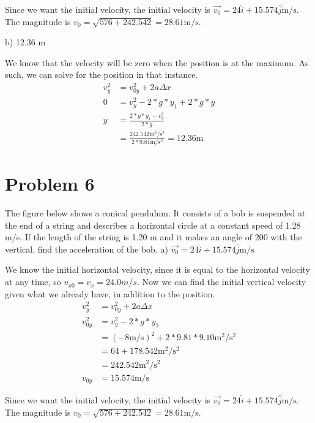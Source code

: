 \documentclass[12pt]{article}
\begin{document}
Since we want the initial velocity, the initial velocity is $ \boxed{ \vec{v_0} = 24\hat{i} + 15.574 \hat{j} \unit{\meter/\second} } $. The magnitude is $ v_0 = \sqrt{576 + 242.542} = 28.61 \unit{\meter/\second} $.

b) 12.36 m

We know that the velocity will be zero when the position is at the maximum. As such, we can solve for the position in that instance.
\begin{align}
    v_y^2 &= v_{0y}^2 + 2a\Delta x\\
    0 &= v_y^2 - 2*g*y_1 + 2*g*y\\
    y &= \frac{2*g*y_1 - v_y^2}{2*g}\\
        &= \frac{242.542 \unit{\meter^2/\second^2}}{2*9.81 \unit{\meter/\second^2}} = \boxed{ 12.36 \unit{\meter} }
\end{align}

\pagebreak
\section*{Problem 6}
The figure below shows a conical pendulum. It consists of a bob is suspended at the end of a
string and describes a horizontal circle at a constant speed of 1.28 m/s. If the length of the
string is 1.20 m and it makes an angle of 200 with the vertical, find the acceleration of the bob.
a) $ \vec{v_0} = 24\hat{i} + 15.574 \hat{j} \unit{\meter/\second} $

We know the initial horizontal velocity, since it is equal to the horizontal velocity at any time, so $ v_{x0} = v_x = 24.0 \unit{m/s} $. Now we can find the initial vertical velocity given what we already have, in addition to the position.
\begin{align}
    v_y^2 &= v_{0y}^2 + 2a\Delta x\\
    v_{0y}^2 &= v_y^2 - 2*g*y_1\\
            &= (-8\unit{\meter/\second})^2 + 2*9.81*9.10 \unit{\meter^2/\second^2}\\
            &= 64 + 178.542 \unit{\meter^2/\second^2}\\
            &= 242.542 \unit{\meter^2/\second^2}\\
    v_{0y} &= 15.574 \unit{\meter/\second}
\end{align}

Since we want the initial velocity, the initial velocity is $ \boxed{ \vec{v_0} = 24\hat{i} + 15.574 \hat{j} \unit{\meter/\second} } $. The magnitude is $ v_0 = \sqrt{576 + 242.542} = 28.61 \unit{\meter/\second} $.
\end{document}
